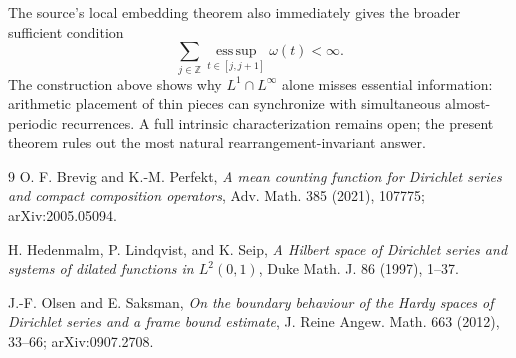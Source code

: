 \documentclass[11pt]{article}
\begin{document}
The source's local embedding theorem also immediately gives the broader
sufficient condition
\[
 \sum_{j\in\mathbb Z}
 \operatorname*{ess\,sup}_{t\in[j,j+1]}\omega(t)<\infty.
\]
The construction above shows why $L^1\cap L^\infty$ alone misses essential
information: arithmetic placement of thin pieces can synchronize with
simultaneous almost-periodic recurrences.  A full intrinsic
characterization remains open; the present theorem rules out the most
natural rearrangement-invariant answer.

\begin{thebibliography}{9}
\small
{}
O. F. Brevig and K.-M. Perfekt,
\emph{A mean counting function for Dirichlet series and compact composition
operators}, Adv. Math. 385 (2021), 107775; arXiv:2005.05094.

H. Hedenmalm, P. Lindqvist, and K. Seip,
\emph{A Hilbert space of Dirichlet series and systems of dilated functions
in $L^2(0,1)$}, Duke Math. J. 86 (1997), 1--37.

J.-F. Olsen and E. Saksman,
\emph{On the boundary behaviour of the Hardy spaces of Dirichlet series and
a frame bound estimate}, J. Reine Angew. Math. 663 (2012), 33--66;
arXiv:0907.2708.
\end{thebibliography}
\end{document}
